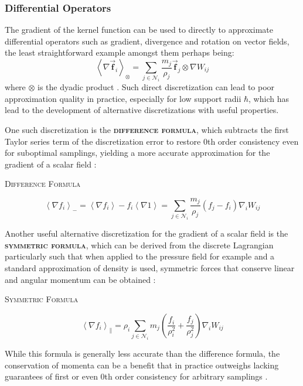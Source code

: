 \documentclass[oneside, a4paper]{book}
\newcommand\emphasis[1]{{\scshape\bfseries#1}}
\newcommand{\equationnamed}[2]{%
  \setlength{\fboxsep}{2pt} %
  \setlength{\fboxrule}{0.01pt}
  \begin{center}
    \begin{minipage}{\textwidth}
      \begin{center}\textsc{#1}\end{center}
      #2
    \end{minipage}
  \end{center}
}
\newcommand\angled[1]{\left\langle#1\right\rangle}
\newcommand\vek[1]{\vec{\bm{#1}}}
\newcommand\br[1]{\left(#1\right)}
\begin{document}
    \subsubsection{Differential Operators}
    The gradient of the kernel function can be used to directly to approximate differential operators such as gradient, divergence and rotation on vector fields, the least straightforward example amongst them perhaps being:
    \begin{equation}
      \angled{\nabla \vek{f}_i}_\otimes = \sum_{j\in\mathcal{N}_i} \frac{m_j}{\rho_j} \vek{f}_j \otimes \nabla W_{ij}
    \end{equation}
    where $\otimes$ is the dyadic product \autocite{tutorial2019}. Such direct discretization can lead to poor approximation quality in practice, especially for low support radii $\hbar$, which has lead to the development of alternative discretizations with useful properties.

    One such discretization is the \emphasis{difference formula}, which subtracts the first Taylor series term of the discretization error to restore 0th order consistency even for suboptimal samplings, yielding a more accurate approximation for the gradient of a scalar field \autocites{tutorial2019}{price-2012}:
    \equationnamed{Difference Formula}{\begin{equation}\label{eq:sph-difference}
      \angled{\nabla f_i}_- = \angled{\nabla f_i} - f_i\angled{\nabla 1} = \sum_{j\in\mathcal{N}_i} \frac{m_j}{\rho_j} \br{f_j - f_i} \nabla_iW_{ij}
    \end{equation}}

    Another useful alternative discretization for the gradient of a scalar field is the \emphasis{symmetric formula}, which can be derived from the discrete Lagrangian particularly such that when applied to the pressure field for example and a standard approximation of density is used, symmetric forces that conserve linear and angular momentum can be obtained \autocites{tutorial2019}{price-2012}:
    \equationnamed{Symmetric Formula}{
      \begin{equation}\label{eq:sph-symmetric}
        \angled{\nabla f_i}_\parallel = \rho_i\sum_{j\in\mathcal{N}_i} m_j \br{\frac{f_i}{\rho_i^2} + \frac{f_j}{\rho_j^2}} \nabla_iW_{ij}
      \end{equation}
    }
    While this formula is generally less accurate than the difference formula, the conservation of momenta can be a benefit that in practice outweighs lacking guarantees of first or even 0th order consistency for arbitrary samplings \autocite{tutorial2019}.
\end{document}
